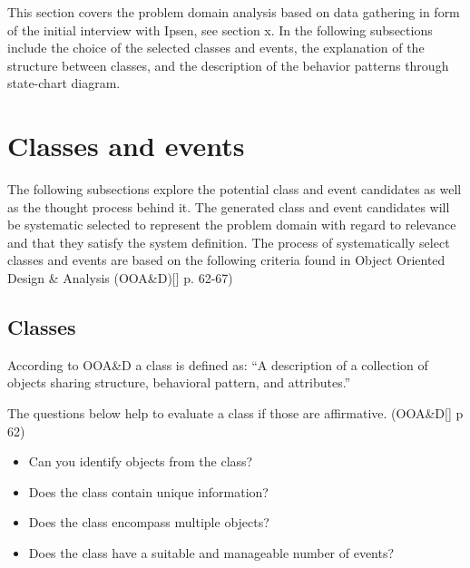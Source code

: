 This section covers the problem domain analysis based on data gathering in form of the initial interview with Ipsen, see section x. In the following subsections include the choice of the selected classes and events, the explanation of the structure between classes, and the description of the behavior patterns through state-chart diagram. 

\section{Classes and events}
The following subsections explore the potential class and event candidates as well as the thought process behind it. The generated class and event candidates will be systematic selected to represent the problem domain with regard to relevance and that they satisfy the system definition. The process of systematically select classes and events are based on the following criteria found in Object Oriented Design \& Analysis (OOA\&D)[] p. 62-67)

\subsection{Classes}
According to OOA\&D a class is defined as:
“A description of a collection of objects sharing structure, behavioral pattern, and attributes.”

The questions below help to evaluate a class if those are affirmative. (OOA\&D[] p 62)
\begin{itemize}
	\item Can you identify objects from the class?
	\item Does the class contain unique information?
	\item Does the class encompass multiple objects?
	\item Does the class have a suitable and manageable number of events?
\end{itemize}

